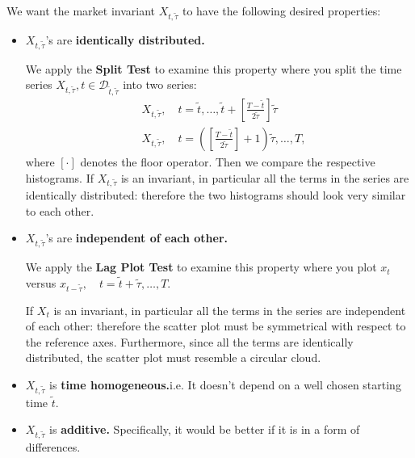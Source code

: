 \documentclass[13pt]{article}
\theoremstyle{definition}
\theoremstyle{remark}
\begin{document}
We want the market invariant $X_{t,\tilde{\tau}}$ to have the following desired properties:
\begin{itemize}
    \item $X_{t,\tilde{\tau}}$'s are \textbf{identically distributed.}

    We apply the \textbf{Split Test} to examine this property where you split the time series $X_{t,\tilde{\tau}}, t\in \mathcal{D}_{\tilde{t}, \widetilde{\tau}}$ into two series:
$$
\begin{aligned}
& X_{t,\tilde{\tau}}, \quad t=\widetilde{t}, \ldots, \widetilde{t}+\left[\frac{T-\widetilde{t}}{2 \widetilde{\tau}}\right] \widetilde{\tau} \\
& X_{t,\tilde{\tau}}, \quad t=\left(\left[\frac{T-\widetilde{t}}{2 \widetilde{\tau}}\right]+1\right) \widetilde{\tau}, \ldots, T,
\end{aligned}
$$
where $[\cdot]$ denotes the floor operator. Then we compare the respective histograms. If $X_{t,\tilde{\tau}}$ is an invariant, in particular all the terms in the series are identically distributed: therefore the two histograms should look very similar to each other.
\item $X_{t,\tilde{\tau}}$'s are \textbf{independent of each other.}

We apply the \textbf{Lag Plot Test} to examine this property where you plot $x_t$ versus $x_{t-\tilde{\tau}}, \quad t=\tilde{t}+\widetilde{\tau}, \ldots, T$.

If $X_t$ is an invariant, in particular all the terms in the series are independent of each other: therefore the scatter plot must be symmetrical with respect to the reference axes. Furthermore, since all the terms are identically distributed, the scatter plot must resemble a circular cloud.
\item $X_{t,\tilde{\tau}}$ is \textbf{time homogeneous.}i.e. It doesn't depend on a well chosen starting time $\tilde{t}$.
\item $X_{t,\tilde{\tau}}$ is \textbf{additive.} Specifically, it would be better if it is in a form of differences.
\end{itemize}
\end{document}
